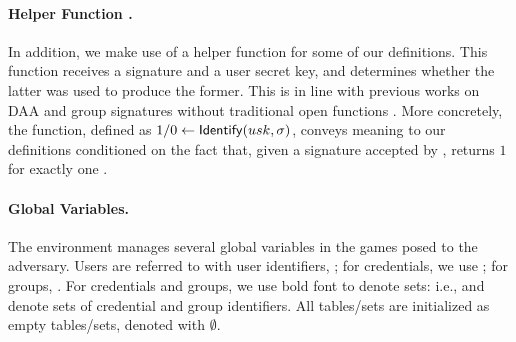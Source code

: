 \paragraph{Helper Function \Identify.} In addition, we make use of a helper
function \Identify for some of our definitions. This function receives
a signature and a user secret key, and determines whether the latter was used
to produce the former. This is in line with previous works on DAA
\cite{bfg+11,cdl16} and group signatures without traditional open functions
\cite{dl21,fgl21,gl19}. More concretely, the \Identify function, defined as $1/0
\gets \mathsf{Identify}(usk,\sigma)$, conveys meaning to our definitions conditioned on
the fact that, given a signature \sig accepted by \Verify, \Identify returns $1$
for exactly one \usk.

\paragraph{Global Variables.} %
The environment manages several global variables in the games posed to the
adversary. Users are referred to with user identifiers, \uid; for credentials,
we use \cid; for groups, \gid. For credentials and groups, we use bold font to
denote sets: i.e., \scid and \sgid denote sets of credential and group
identifiers. All tables/sets are initialized as empty tables/sets, denoted
with $\emptyset$.

